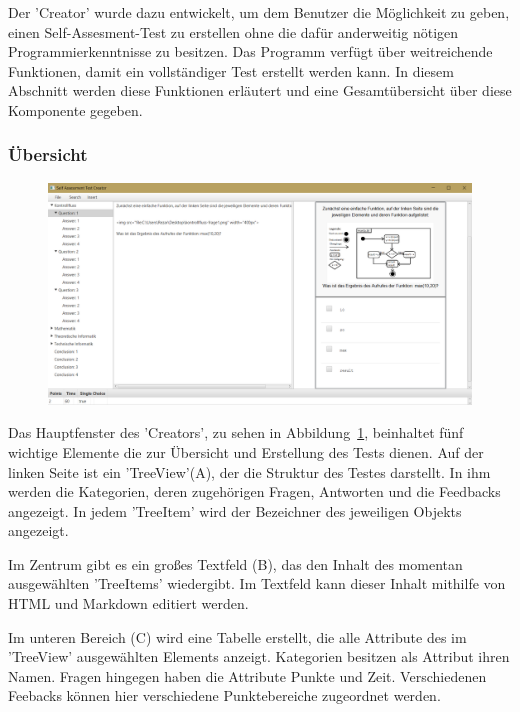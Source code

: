 \label{Julian}

Der 'Creator' wurde dazu entwickelt, um dem Benutzer die Möglichkeit zu geben, einen Self-Assesment-Test zu erstellen ohne die dafür anderweitig nötigen Programmierkenntnisse zu besitzen.
Das Programm verfügt über weitreichende Funktionen, damit ein vollständiger Test erstellt werden kann. 
In diesem Abschnitt werden diese Funktionen erläutert und eine Gesamtübersicht über diese Komponente gegeben. 

\subsubsection{Übersicht}
\begin{figure}[htbp] 
  \centering
     \includegraphics[width=\textwidth]{Julian_Images/Creator-Uebersicht.png}
  \caption{}
  \label{fig:Bild0}
\end{figure}
Das Hauptfenster des 'Creators', zu sehen in Abbildung~\ref{fig:Bild0}, beinhaltet fünf wichtige Elemente die zur Übersicht und Erstellung des Tests dienen.
Auf der linken Seite ist ein 'TreeView'(A), der die Struktur des Testes darstellt.
In ihm werden die Kategorien, deren zugehörigen Fragen, Antworten und die Feedbacks angezeigt.
In jedem 'TreeItem' wird der Bezeichner des jeweiligen Objekts angezeigt.

Im Zentrum gibt es ein großes Textfeld (B), das den Inhalt des momentan ausgewählten 'TreeItems' wiedergibt.
Im Textfeld kann dieser Inhalt mithilfe von HTML und Markdown editiert werden.

Im unteren Bereich (C) wird eine Tabelle erstellt, die alle Attribute des im 'TreeView'  ausgewählten Elements anzeigt.
Kategorien besitzen als Attribut ihren Namen.
Fragen hingegen haben die Attribute Punkte und Zeit.
Verschiedenen Feebacks können hier verschiedene Punktebereiche zugeordnet werden.

